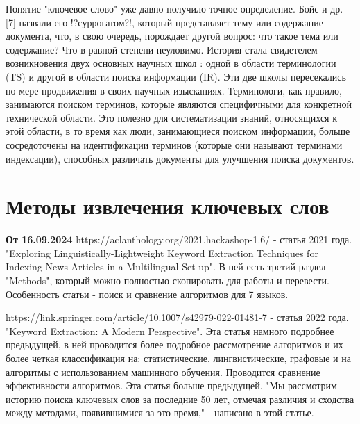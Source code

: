 \documentclass[bachelor, och, diploma ]{SCWorks}
\begin{document}
\tableofcontents







\intro

Понятие "ключевое слово" уже давно получило точное определение.
Бойс и др. [7] назвали его !?суррогатом?!, который представляет тему
или содержание документа, что, в свою очередь, порождает другой
вопрос: что такое тема или содержание? Что в равной степени неуловимо. История стала свидетелем возникновения двух основных научных школ
: одной в области терминологии (TS) и другой в
области поиска информации (IR). Эти две
школы пересекались по мере продвижения в своих научных изысканиях. Терминологи, как правило, занимаются поиском терминов, которые являются
специфичными для конкретной технической области. Это полезно для систематизации
знаний, относящихся к этой области, в то время как люди, занимающиеся поиском информации, больше сосредоточены на идентификации терминов (которые
они называют терминами индексации), способных различать
документы для улучшения поиска документов.

\section{Методы извлечения ключевых слов}
\textbf{От 16.09.2024}
https://aclanthology.org/2021.hackashop-1.6/ - статья 2021 года. 
"Exploring Linguistically-Lightweight Keyword Extraction Techniques for
Indexing News Articles in a Multilingual Set-up".
В ней есть третий раздел "Methods", который можно полностью скопировать для работы и перевести. Особенность статьи - поиск и сравнение алгоритмов для 7 языков.

https://link.springer.com/article/10.1007/s42979-022-01481-7 - статья 2022 года. "Keyword Extraction: A Modern Perspective".
Эта статья намного подробнее предыдущей, в ней проводится более подробное рассмотрение алгоритмов и их более четкая классификация на: статистические, лингвистические, графовые и на алгоритмы с использованием машинного обучения. Проводится сравнение эффективности алгоритмов. Эта статья больше предыдущей. "Мы рассмотрим историю поиска ключевых
слов за последние 50 лет, отмечая различия и сходства между методами, появившимися за это время," - написано в этой статье.
\end{document}
